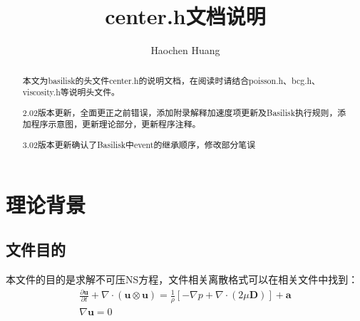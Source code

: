 \documentclass[lang=cn,11pt,a4paper]{elegantpaper}
\title{center.h文档说明}
\author{Haochen Huang}
\institute{西安交通大学MFM课题组}
\date{\zhtoday}
\begin{document}
\maketitle
\tableofcontents

\begin{abstract}
本文为basilisk的头文件center.h的说明文档，在阅读时请结合poisson.h、bcg.h、viscosity.h等说明头文件。\par
2.02版本更新，全面更正之前错误，添加附录解释加速度项更新及Basilisk执行规则，添加程序示意图，更新理论部分，更新程序注释。\par
3.02版本更新确认了Basilisk中event的继承顺序，修改部分笔误

\end{abstract}


\section{理论背景}

\subsection{文件目的}
本文件的目的是求解不可压NS方程，文件相关离散格式可以在相关文件中找到\cite{popinet2003gerris}\cite{popinet_accurate_2009}：
\begin{gather}\label{equ:bukeyans}
    \frac{\partial \mathbf{u}}{\partial t}+\nabla\cdot(\mathbf{u}\otimes\mathbf{u})= \frac{1}{\rho}[-\nabla p+\nabla\cdot(2\mu\mathbf{D})]+\mathbf{a}\\
    \nabla \mathbf{u} = 0
\end{gather}
\end{document}
